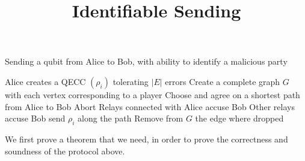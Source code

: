 \documentclass{article}
\title{Identifiable Sending}
\begin{document}
\maketitle

\begin{algorithm}
	\caption{Sending a qubit from Alice to Bob, with ability to identify a malicious party}
	\label{isalg}
	\begin{algorithmic}[1]
		\State Alice creates a QECC $(\rho_i)$ tolerating $|E|$ errors
		\State Create a complete graph $G$ with each vertex corresponding to a player
			\State Choose and agree on a shortest path from Alice to Bob
				\State Abort
				\State Relays connected with Alice accuse Bob
				\State Other relays accuse Bob
			\EndIf
		\State send $\rho_i$ along the path
			\State Remove from $G$ the edge where dropped
		\EndIf
		\EndFor
	\end{algorithmic}
\end{algorithm}

We first prove a theorem that we need, in order to prove the correctness and soundness of the protocol above.
\end{document}
